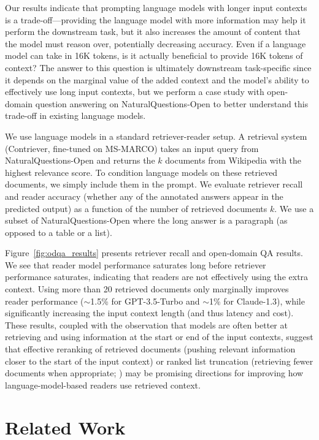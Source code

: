 Our results indicate that prompting language models with longer input contexts is a trade-off---providing the language model with more information may help it perform the downstream task, but it also increases the amount of content that the model must reason over, potentially decreasing accuracy. Even if a language model can take in 16K tokens, is it actually beneficial to provide 16K tokens of context? The answer to this question is ultimately downstream task-specific since it depends on the marginal value of the added context and the model's ability to effectively use long input contexts, but we perform a case study with open-domain question answering on NaturalQuestions-Open to better understand this trade-off in existing language models.

We use language models in a standard retriever-reader setup. A retrieval system (Contriever, fine-tuned on MS-MARCO) takes an input query from NaturalQuestions-Open and returns the $k$ documents from Wikipedia with the highest relevance score. To condition language models on these retrieved documents, we simply include them in the prompt. We evaluate retriever recall and reader accuracy (whether any of the annotated answers appear in the predicted output) as a function of the number of retrieved documents $k$. We use a subset of NaturalQuestions-Open where the long answer is a paragraph (as opposed to a table or a list).

Figure~\ref{fig:odqa_results} presents retriever recall and open-domain QA results. We see that reader model performance saturates long before retriever performance saturates, indicating that readers are not effectively using the extra context. Using more than 20 retrieved documents only marginally improves reader performance ($\sim$1.5\% for GPT-3.5-Turbo and $\sim$1\% for Claude-1.3), while significantly increasing the input context length (and thus latency and cost). These results, coupled with the observation that models are often better at retrieving and using information at the start or end of the input contexts, suggest that effective reranking of retrieved documents (pushing relevant information closer to the start of the input context) or ranked list truncation (retrieving fewer documents when appropriate; \citealp{arampatzis2009stop}) may be promising directions for improving how language-model-based readers use retrieved context.

\section{Related Work}

